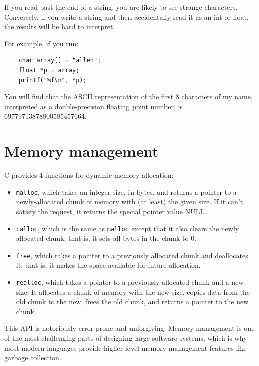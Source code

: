 \documentclass[12pt]{book}
\begin{document}
{If you read past the end of a string, you are likely to see
strange characters.  Conversely, if you write a string and
then accidentally read it as an int or float, the results
will be hard to interpret.

For example, if you run:

\begin{verbatim}
    char array[] = "allen";
    float *p = array;
    printf("%f\n", *p);
\end{verbatim}

You will find that the ASCII representation of the first 8 characters
of my name, interpreted as a double-precision floating point number,
is 69779713878800585457664.



\chapter{Memory management}

C provides 4 functions for dynamic memory allocation:

\begin{itemize}

\item {\tt malloc}, which takes an integer size, in bytes, and returns
a pointer to a newly-allocated chunk of memory with (at least) the
given size.  If it can't satisfy the request, it returns
the special pointer value NULL.

\item {\tt calloc}, which is the same as {\tt malloc} except that
it also clears the newly allocated chunk; that
is, it sets all bytes in the chunk to 0.

\item {\tt free}, which takes a pointer to a previously allocated
chunk and deallocates it; that is, it makes the space available for
future allocation.

\item {\tt realloc}, which takes a pointer to a previously allocated
chunk and a new size.  It allocates a chunk of memory with the new
size, copies data from the old chunk to the new, frees the old chunk,
and returns a pointer to the new chunk.

\end{itemize}

This API is notoriously error-prone and unforgiving.  Memory management
is one of the most challenging parts of designing large software systems,
which is why most modern languages provide higher-level memory
management features like garbage collection.


}
\end{document}
